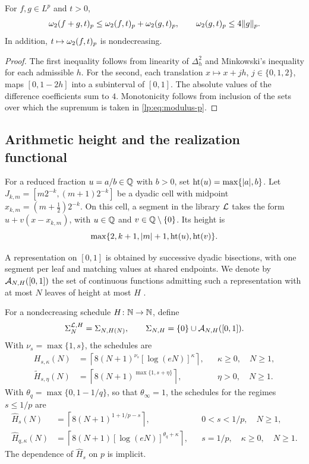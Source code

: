 \documentclass[11pt,a4paper]{article}
\begin{document}
\begin{lema}
\label{lp:lem:modulus}
For $f,g\in L^p$ and $t>0$,
\[
 \omega_2(f+g,t)_{p}\le\omega_2(f,t)_{p}+\omega_2(g,t)_{p},
 \qquad \omega_2(g,t)_{p}\le4\|g\|_p.
\]
In addition, $t\mapsto\omega_2(f,t)_{p}$ is nondecreasing.
\end{lema}

\begin{proof}
The first inequality follows from linearity of $\Delta_h^2$ and Minkowski's inequality for each admissible $h$. For the second, each translation $x\mapsto x+jh$, $j\in\{0,1,2\}$, maps $[0,1-2h]$ into a subinterval of $[0,1]$. The absolute values of the difference coefficients sum to $4$. Monotonicity follows from inclusion of the sets over which the supremum is taken in \eqref{lp:eq:modulus-p}.
\end{proof}

\subsection{Arithmetic height and the realization functional}

For a reduced fraction $u=a/b\in\mathbb Q$ with $b>0$, set
$\operatorname{ht}(u)=\max\{|a|,b\}$. Let $J_{k,m}=[m2^{-k},(m+1)2^{-k}]$ be a dyadic cell with midpoint $x_{k,m}=(m+\tfrac12)2^{-k}$. On this cell, a segment in the library $\mathcal L$ takes the form $u+v(x-x_{k,m})$, with $u\in\mathbb Q$ and $v\in\mathbb Q\setminus\{0\}$. Its height is
\[
 \max\{2,k+1,|m|+1,\operatorname{ht}(u),\operatorname{ht}(v)\}.
\]

A representation on $[0,1]$ is obtained by successive dyadic bisections, with one segment per leaf and matching values at shared endpoints. We denote by $\mathcal A_{N,H}([0,1])$ the set of continuous functions admitting such a representation with at most $N$ leaves of height at most $H$ \citep{lp-oliveiravol}.

For a nondecreasing schedule $H\colon\mathbb N\to\mathbb N$, define
\begin{equation}
 \Sigma_{N}^{\mathcal L,H}=\Sigma_{N,H(N)},\qquad \Sigma_{N,H}=\{0\}\cup\mathcal A_{N,H}([0,1]).
 \label{lp:eq:sigma}
\end{equation}
With $\nu_s=\max\{1,s\}$, the schedules are
\begin{align}
 H_{s,\kappa}(N)
 &=\left\lceil8(N+1)^{\nu_s}[\log(eN)]^\kappa\right\rceil,
 &&\kappa\ge0,\quad N\ge1,\label{lp:eq:schedule}\\
 \widetilde H_{s,\eta}(N)
 &=\left\lceil8(N+1)^{\max\{1,s+\eta\}}\right\rceil,
 &&\eta>0,\quad N\ge1.\label{lp:eq:slack}
\end{align}
With $\theta_q=\max\{0,1-1/q\}$, so that $\theta_\infty=1$, the schedules for the regimes $s\le1/p$ are
\begin{align}
 \widehat H_{s}(N)
 &=\left\lceil8(N+1)^{1+1/p-s}\right\rceil,
 &&0<s<1/p,\quad N\ge1,\label{lp:eq:schedule-low}\\
 \widehat H_{q,\kappa}(N)
 &=\left\lceil8(N+1)[\log(eN)]^{\theta_q+\kappa}\right\rceil,
 &&s=1/p,\quad\kappa\ge0,\quad N\ge1.\label{lp:eq:schedule-diag}
\end{align}
The dependence of $\widehat H_s$ on $p$ is implicit.
\end{document}
